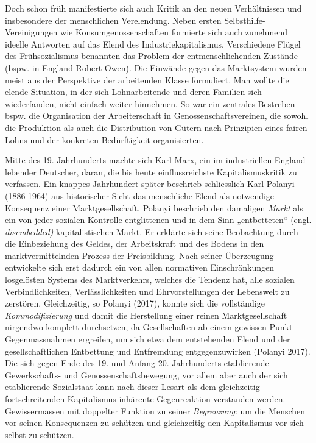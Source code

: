 \documentclass[
  nswissgerman,
  a4paper,
  DIV=11,
  numbers=noendperiod,
  oneside,
  openany]{scrreprt}
\begin{document}
Doch schon früh manifestierte sich auch Kritik an den neuen
Verhältnissen und insbesondere der menschlichen Verelendung. Neben
ersten Selbsthilfe-Vereinigungen wie Konsumgenossenschaften formierte
sich auch zunehmend ideelle Antworten auf das Elend des
Industriekapitalismus. Verschiedene Flügel des Frühsozialismus benannten
das Problem der entmenschlichenden Zustände (bspw. in England Robert
Owen). Die Einwände gegen das Marktsystem wurden meist aus der
Perspektive der arbeitenden Klasse formuliert. Man wollte die elende
Situation, in der sich Lohnarbeitende und deren Familien sich
wiederfanden, nicht einfach weiter hinnehmen. So war ein zentrales
Bestreben bspw. die Organisation der Arbeiterschaft in
Genossenschaftsvereinen, die sowohl die Produktion als auch die
Distribution von Gütern nach Prinzipien eines fairen Lohns und der
konkreten Bedürftigkeit organisierten.

Mitte des 19. Jahrhunderts machte sich Karl Marx, ein im industriellen
England lebender Deutscher, daran, die bis heute einflussreichste
Kapitalismuskritik zu verfassen. Ein knappes Jahrhundert später
beschrieb schliesslich Karl Polanyi (1886-1964) aus historischer Sicht
das menschliche Elend als notwendige Konsequenz einer Marktgesellschaft.
Polanyi beschrieb den damaligen \emph{Markt} als ein von jeder sozialen
Kontrolle entglittenen und in dem Sinn „entbetteten`` (engl.
\emph{disembedded)} kapitalistischen Markt. Er erklärte sich seine
Beobachtung durch die Einbeziehung des Geldes, der Arbeitskraft und des
Bodens in den marktvermittelnden Prozess der Preisbildung. Nach seiner
Überzeugung entwickelte sich erst dadurch ein von allen normativen
Einschränkungen losgelösten Systems des Marktverkehrs, welches die
Tendenz hat, alle sozialen Verbindlichkeiten, Verlässlichkeiten und
Ehrvorstellungen der Lebenswelt zu zerstören. Gleichzeitig, so Polanyi
(2017), konnte sich die vollständige \emph{Kommodifizierung} und damit
die Herstellung einer reinen Marktgesellschaft nirgendwo komplett
durchsetzen, da Gesellschaften ab einem gewissen Punkt Gegenmassnahmen
ergreifen, um sich etwa dem entstehenden Elend und der
gesellschaftlichen Entbettung und Entfremdung entgegenzuwirken (Polanyi
2017). Die sich gegen Ende des 19. und Anfang 20. Jahrhunderts
etablierende Gewerkschafts- und Genossenschaftsbewegung, vor allem aber
auch der sich etablierende Sozialstaat kann nach dieser Lesart als dem
gleichzeitig fortschreitenden Kapitalismus inhärente Gegenreaktion
verstanden werden. Gewissermassen mit doppelter Funktion zu seiner
\emph{Begrenzung}: um die Menschen vor seinen Konsequenzen zu schützen
und gleichzeitig den Kapitalismus vor sich selbst zu schützen.
\end{document}
